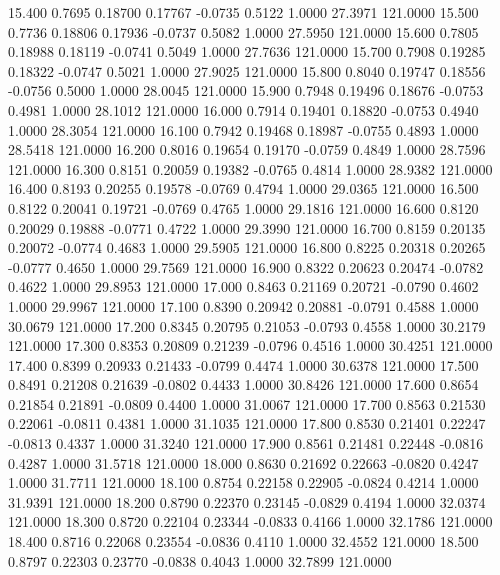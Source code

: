   15.400   0.7695   0.18700   0.17767  -0.0735   0.5122   1.0000  27.3971 121.0000
  15.500   0.7736   0.18806   0.17936  -0.0737   0.5082   1.0000  27.5950 121.0000
  15.600   0.7805   0.18988   0.18119  -0.0741   0.5049   1.0000  27.7636 121.0000
  15.700   0.7908   0.19285   0.18322  -0.0747   0.5021   1.0000  27.9025 121.0000
  15.800   0.8040   0.19747   0.18556  -0.0756   0.5000   1.0000  28.0045 121.0000
  15.900   0.7948   0.19496   0.18676  -0.0753   0.4981   1.0000  28.1012 121.0000
  16.000   0.7914   0.19401   0.18820  -0.0753   0.4940   1.0000  28.3054 121.0000
  16.100   0.7942   0.19468   0.18987  -0.0755   0.4893   1.0000  28.5418 121.0000
  16.200   0.8016   0.19654   0.19170  -0.0759   0.4849   1.0000  28.7596 121.0000
  16.300   0.8151   0.20059   0.19382  -0.0765   0.4814   1.0000  28.9382 121.0000
  16.400   0.8193   0.20255   0.19578  -0.0769   0.4794   1.0000  29.0365 121.0000
  16.500   0.8122   0.20041   0.19721  -0.0769   0.4765   1.0000  29.1816 121.0000
  16.600   0.8120   0.20029   0.19888  -0.0771   0.4722   1.0000  29.3990 121.0000
  16.700   0.8159   0.20135   0.20072  -0.0774   0.4683   1.0000  29.5905 121.0000
  16.800   0.8225   0.20318   0.20265  -0.0777   0.4650   1.0000  29.7569 121.0000
  16.900   0.8322   0.20623   0.20474  -0.0782   0.4622   1.0000  29.8953 121.0000
  17.000   0.8463   0.21169   0.20721  -0.0790   0.4602   1.0000  29.9967 121.0000
  17.100   0.8390   0.20942   0.20881  -0.0791   0.4588   1.0000  30.0679 121.0000
  17.200   0.8345   0.20795   0.21053  -0.0793   0.4558   1.0000  30.2179 121.0000
  17.300   0.8353   0.20809   0.21239  -0.0796   0.4516   1.0000  30.4251 121.0000
  17.400   0.8399   0.20933   0.21433  -0.0799   0.4474   1.0000  30.6378 121.0000
  17.500   0.8491   0.21208   0.21639  -0.0802   0.4433   1.0000  30.8426 121.0000
  17.600   0.8654   0.21854   0.21891  -0.0809   0.4400   1.0000  31.0067 121.0000
  17.700   0.8563   0.21530   0.22061  -0.0811   0.4381   1.0000  31.1035 121.0000
  17.800   0.8530   0.21401   0.22247  -0.0813   0.4337   1.0000  31.3240 121.0000
  17.900   0.8561   0.21481   0.22448  -0.0816   0.4287   1.0000  31.5718 121.0000
  18.000   0.8630   0.21692   0.22663  -0.0820   0.4247   1.0000  31.7711 121.0000
  18.100   0.8754   0.22158   0.22905  -0.0824   0.4214   1.0000  31.9391 121.0000
  18.200   0.8790   0.22370   0.23145  -0.0829   0.4194   1.0000  32.0374 121.0000
  18.300   0.8720   0.22104   0.23344  -0.0833   0.4166   1.0000  32.1786 121.0000
  18.400   0.8716   0.22068   0.23554  -0.0836   0.4110   1.0000  32.4552 121.0000
  18.500   0.8797   0.22303   0.23770  -0.0838   0.4043   1.0000  32.7899 121.0000
